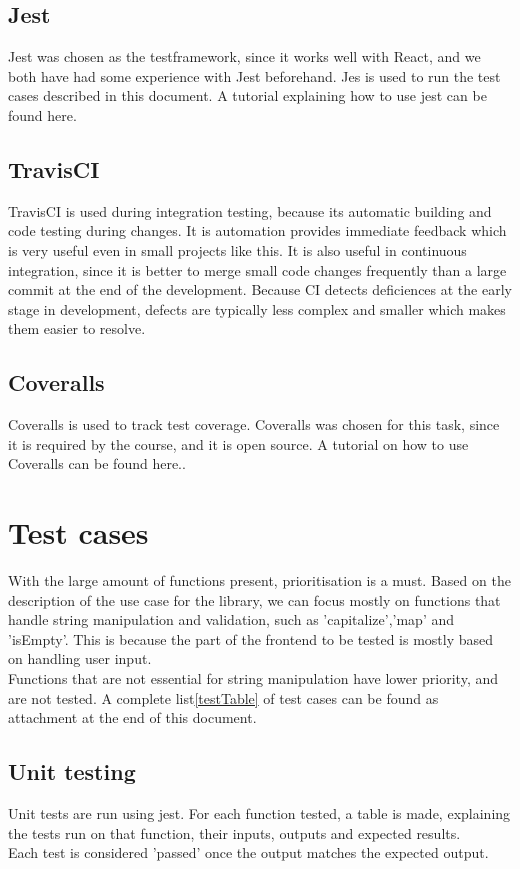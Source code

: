 \documentclass[a4paper, 12pt]{article}
\begin{document}
    \subsection{Jest}
    Jest\cite{Jest} was chosen as the testframework, since it works well with React, and we both have had some experience with Jest beforehand.
    Jes is used to run the test cases described in this document. A tutorial explaining how to use jest can be found here.\cite{JestTutorial}
    \subsection{TravisCI}
    TravisCI\cite{Travis} is used during integration testing, because its automatic building and code testing during changes. It is automation provides immediate feedback which 
    is very useful even in small projects like this. It is also useful in continuous integration, since it is better to merge small code changes frequently than a large commit at 
    the end of the development. Because CI detects deficiences at the early stage in development, defects are typically less complex and smaller which makes them easier to resolve. 
    \subsection{Coveralls}
    Coveralls\cite{coveralls} is used to track test coverage. Coveralls was chosen for this task, since it is required by the course, and it is open source. 
    A tutorial on how to use Coveralls can be found here.\cite{coverallsTutorial}.
    
\section{Test cases}
With the large amount of functions present, prioritisation is a must.
Based on the description of the use case for the library, we can focus mostly on functions that handle string manipulation and validation,
such as 'capitalize','map' and 'isEmpty'. This is because the part of the frontend to be tested  is mostly based on handling user input.
\\
Functions that are not essential for string manipulation have lower priority, and are not tested.
A complete list\ref{testTable} of test cases can be found as attachment at the end of this document.


\subsection{Unit testing}
Unit tests are run using jest. For each function tested, a table is made, explaining the tests run on that function,
their inputs, outputs and expected results. 
\\
Each test is considered 'passed' once the output matches the expected output. 
\end{document}
